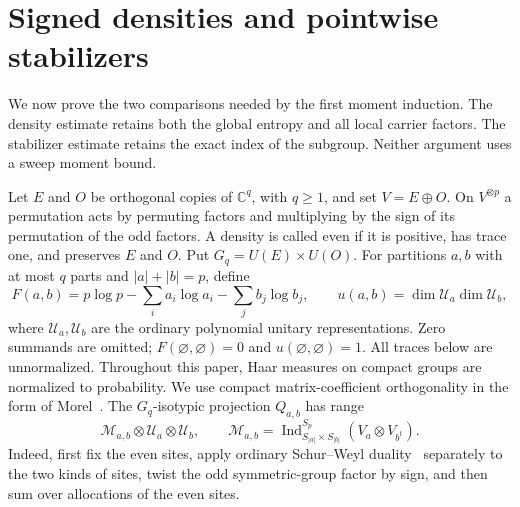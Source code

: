 \section{Signed densities and pointwise stabilizers}\label{sec:static}\label{ten:guide}
We now prove the two comparisons needed by the first moment induction. The density estimate retains both the global entropy and all local carrier factors. The stabilizer estimate retains the exact index of the subgroup. Neither argument uses a sweep moment bound.


Let $E$ and $O$ be orthogonal copies of $\mathbb C^q$, with $q\ge1$,
and set $V=E\oplus O$. On $V^{\otimes p}$ a permutation acts by
permuting factors and multiplying by the sign of its permutation of the
odd factors. A density is called even if it is positive, has trace one,
and preserves $E$ and $O$. Put $G_q=U(E)\times U(O)$.
For partitions $a,b$ with at most $q$ parts and $|a|+|b|=p$, define
\[
 F(a,b)=p\log p-\sum_i a_i\log a_i-\sum_jb_j\log b_j,
 \qquad u(a,b)=\dim\mathcal U_a\dim\mathcal U_b,
\]
where $\mathcal U_a,\mathcal U_b$ are the ordinary polynomial unitary
representations. Zero summands are omitted; $F(\varnothing,\varnothing)=0$
and $u(\varnothing,\varnothing)=1$. All traces below are unnormalized.
Throughout this paper, Haar measures on compact groups are normalized to
probability. We use compact matrix-coefficient orthogonality in the form
of Morel~\cite[Theorem IV.3.8(i)--(ii), pp.~84--85]{Morel2018}.
The $G_q$-isotypic projection $Q_{a,b}$ has range
\begin{equation}
 \mathcal M_{a,b}\otimes\mathcal U_a\otimes\mathcal U_b,
 \qquad
 \mathcal M_{a,b}=
 \operatorname{Ind}_{S_{|a|}\times S_{|b|}}^{S_p}
          (V_a\otimes V_{b^t}).
 \label{eq:signed-sector-decomposition}
\end{equation}
Indeed, first fix the even sites, apply ordinary Schur--Weyl duality~\cite[Theorem 4.57 and Corollary 4.59]{etingof}
separately to the two kinds of sites, twist the odd symmetric-group
factor by sign, and then sum over allocations of the even sites.

